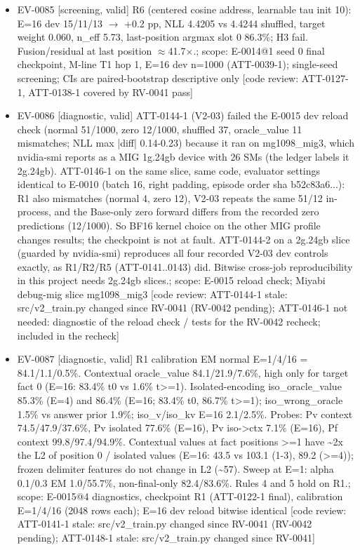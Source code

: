 \documentclass[11pt]{article}
\begin{document}
\begin{itemize}
\item EV-0085 [screening, valid] R6 (centered cosine address, learnable tau init 10): E=16 dev 15/11/13 \ensuremath{\rightarrow} +0.2 pp, NLL 4.4205 vs 4.4244 shuffled, target weight 0.060, n\_eff 5.73, last-position argmax slot 0 86.3\%; H3 fail. Fusion/residual at last position \ensuremath{\approx}41.7\ensuremath{\times}.; scope: E-0014@1 seed 0 final checkpoint, M-line T1 hop 1, E=16 dev n=1000 (ATT-0039-1); single-seed screening; CIs are paired-bootstrap descriptive only [code review: ATT-0127-1, ATT-0138-1 covered by RV-0041 pass]
\item EV-0086 [diagnostic, valid] ATT-0144-1 (V2-03) failed the E-0015 dev reload check (normal 51/1000, zero 12/1000, shuffled 37, oracle\_value 11 mismatches; NLL max |diff| 0.14-0.23) because it ran on mg1098\_mig3, which nvidia-smi reports as a MIG 1g.24gb device with 26 SMs (the ledger labels it 2g.24gb). ATT-0146-1 on the same slice, same code, evaluator settings identical to E-0010 (batch 16, right padding, episode order sha b52c83a6...): R1 also mismatches (normal 4, zero 12), V2-03 repeats the same 51/12 in-process, and the Base-only zero forward differs from the recorded zero predictions (12/1000). So BF16 kernel choice on the other MIG profile changes results; the checkpoint is not at fault. ATT-0144-2 on a 2g.24gb slice (guarded by nvidia-smi) reproduces all four recorded V2-03 dev controls exactly, as R1/R2/R5 (ATT-0141..0143) did. Bitwise cross-job reproducibility in this project needs 2g.24gb slices.; scope: E-0015 reload check; Miyabi debug-mig slice mg1098\_mig3 [code review: ATT-0144-1 stale: src/v2\_train.py changed since RV-0041 (RV-0042 pending); ATT-0146-1 not needed: diagnostic of the reload check / tests for the RV-0042 recheck; included in the recheck]
\item EV-0087 [diagnostic, valid] R1 calibration EM normal E=1/4/16 = 84.1/1.1/0.5\%. Contextual oracle\_value 84.1/21.9/7.6\%, high only for target fact 0 (E=16: 83.4\% t0 vs 1.6\% t\textgreater{}=1). Isolated-encoding iso\_oracle\_value 85.3\% (E=4) and 86.4\% (E=16; 83.4\% t0, 86.7\% t\textgreater{}=1); iso\_wrong\_oracle 1.5\% vs answer prior 1.9\%; iso\_v/iso\_kv E=16 2.1/2.5\%. Probes: Pv context 74.5/47.9/37.6\%, Pv isolated 77.6\% (E=16), Pv iso-\textgreater{}ctx 7.1\% (E=16), Pf context 99.8/97.4/94.9\%. Contextual values at fact positions \textgreater{}=1 have \textasciitilde{}2x the L2 of position 0 / isolated values (E=16: 43.5 vs 103.1 (1-3), 89.2 (\textgreater{}=4)); frozen delimiter features do not change in L2 (\textasciitilde{}57). Sweep at E=1: alpha 0.1/0.3 EM 1.0/55.7\%, non-final-only 82.4/83.6\%. Rules 4 and 5 hold on R1.; scope: E-0015@4 diagnostics, checkpoint R1 (ATT-0122-1 final), calibration E=1/4/16 (2048 rows each); E=16 dev reload bitwise identical [code review: ATT-0141-1 stale: src/v2\_train.py changed since RV-0041 (RV-0042 pending); ATT-0148-1 stale: src/v2\_train.py changed since RV-0041]

\end{itemize}
\end{document}
